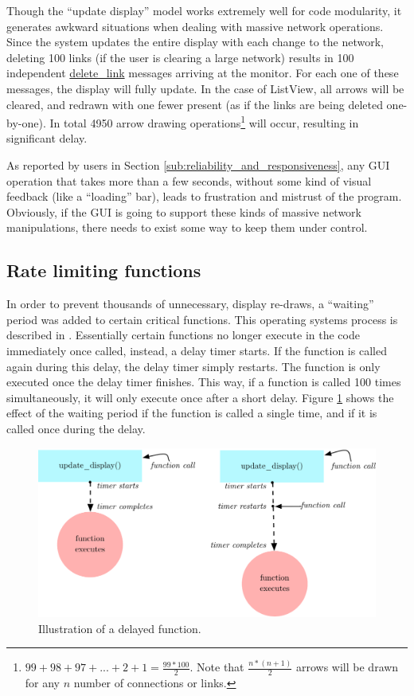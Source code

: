 Though the ``update display'' model works extremely well for code modularity, it generates awkward situations when dealing with massive network operations. Since the system updates the entire display with each change to the network, deleting 100 links (if the user is clearing a large network) results in 100 independent \url{delete_link} messages arriving at the monitor. For each one of these messages, the display will fully update. In the case of ListView, all arrows will be cleared, and redrawn with one fewer present (as if the links are being deleted one-by-one). In total 4950 arrow drawing operations\footnote{$99 + 98 + 97 + ... + 2 + 1 = \frac{99*100}{2}$. Note that $\frac{n*(n+1)}{2}$ arrows will be drawn for any $n$ number of connections or links.} will occur, resulting in significant delay. 

As reported by users in Section \ref{sub:reliability_and_responsiveness}, any GUI operation that takes more than a few seconds, without some kind of visual feedback (like a ``loading'' bar), leads to frustration and mistrust of the program. Obviously, if the GUI is going to support these kinds of massive network manipulations, there needs to exist some way to keep them under control.

	\subsection{Rate limiting functions} %
	\label{sub:rate_limiting_certain_functions}

In order to prevent thousands of unnecessary, display re-draws, a ``waiting'' period was added to certain critical functions. This operating systems process is described in . Essentially certain functions no longer execute in the code immediately once called, instead, a delay timer starts. If the function is called again during this delay, the delay timer simply restarts. The function is only executed once the delay timer finishes. This way, if a function is called 100 times simultaneously, it will only execute once after a short delay. Figure \ref{fig:waiting_period} shows the effect of the waiting period if the function is called a single time, and if it is called once during the delay.

\begin{figure}
	\centering
		\includegraphics[width=1\textwidth]{figures/waiting_period}
		\caption{Illustration of a delayed function.}
		\label{fig:waiting_period}
\end{figure}

